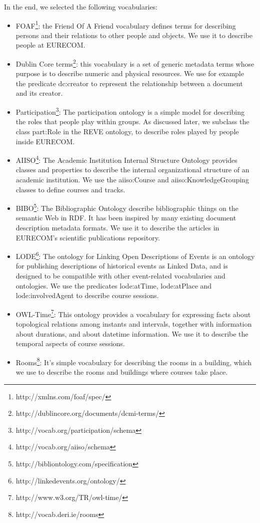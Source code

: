 \documentclass[a4paper,11pt]{report}
\begin{document}
In the end, we selected the following vocabularies: 
\begin{itemize}
\item FOAF\footnote{http://xmlns.com/foaf/spec/}: the Friend Of A Friend vocabulary defines terms for describing persons and their relations to other people and objects. We use it to describe people at EURECOM. 
\item Dublin Core terms\footnote{http://dublincore.org/documents/dcmi-terms/}: this vocabulary is a set of generic metadata terms whose purpose is to describe numeric and physical resources. We use for example the predicate dc:creator to represent the relationship between a document and its creator. 
\item Participation\footnote{http://vocab.org/participation/schema}: The participation ontology is a simple model for describing the roles that people play within groups. As discussed later, we subclass the class part:Role in the REVE ontology, to describe roles played by people inside EURECOM. 
\item AIISO\footnote{http://vocab.org/aiiso/schema}: The Academic Institution Internal Structure Ontology provides classes and properties to describe the internal organizational structure of an academic institution. We use the aiiso:Course and aiiso:KnowledgeGrouping classes to define courses and tracks. 
\item BIBO\footnote{http://bibliontology.com/specification}:  The Bibliographic Ontology describe bibliographic things on the semantic Web in RDF. It has been inspired by many existing document description metadata formats. We use it to describe the articles in EURECOM's scientific publications repository. 
\item LODE\footnote{http://linkedevents.org/ontology/}: The ontology for Linking Open Descriptions of Events is an ontology for publishing descriptions of historical events as Linked Data, and is designed to be compatible with other event-related vocabularies and ontologies. We use the predicates lode:atTime, lode:atPlace and lode:involvedAgent to describe course sessions. 
\item OWL-Time\footnote{http://www.w3.org/TR/owl-time/}: This ontology provides a vocabulary for expressing facts about topological relations among instants and intervals, together with information about durations, and about datetime information. We use it to describe the temporal aspects of course sessions. 
\item Rooms\footnote{http://vocab.deri.ie/rooms}: It's simple vocabulary for describing the rooms in a building, which we use to describe the rooms and buildings where courses take place. 
\end{itemize}
\end{document}
